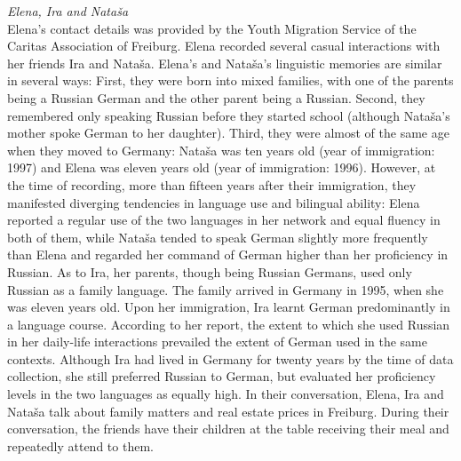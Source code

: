\noindent \textit{Elena, Ira and Nataša}\\
Elena's contact details was provided by the Youth Migration Service of the Caritas Association of Freiburg. Elena recorded several casual interactions with her friends Ira and Nataša. Elena's and Nataša's linguistic memories are similar in several ways: First, they were born into mixed families, with one of the parents being a Russian German and the other parent being a Russian. Second, they remembered only speaking Russian before they started school (although Nataša's mother spoke German to her daughter). Third, they were almost of the same age when they moved to Germany: Nataša was ten years old (year of immigration: 1997) and Elena was eleven years old (year of immigration: 1996). However, at the time of recording, more than fifteen years after their immigration, they manifested diverging tendencies in language use and bilingual ability: Elena reported a regular use of the two languages in her network and equal fluency in both of them, while Nataša tended to speak German slightly more frequently than Elena and regarded her command of German higher than her proficiency in Russian. As to Ira, her parents, though being Russian Germans, used only Russian as a family language. The family arrived in Germany in 1995, when she was eleven years old. Upon her immigration, Ira learnt German predominantly in a language course. According to her report, the extent to which she used Russian in her daily-life interactions prevailed the extent of German used in the same contexts. Although Ira had lived in Germany for twenty years  by the time of data collection, she still preferred Russian to German, but evaluated her proficiency levels in the two languages as equally high. In their conversation, Elena, Ira and Nataša talk about family matters and real estate prices in Freiburg. During their conversation, the friends have their children at the table receiving their meal and repeatedly attend to them.\\

